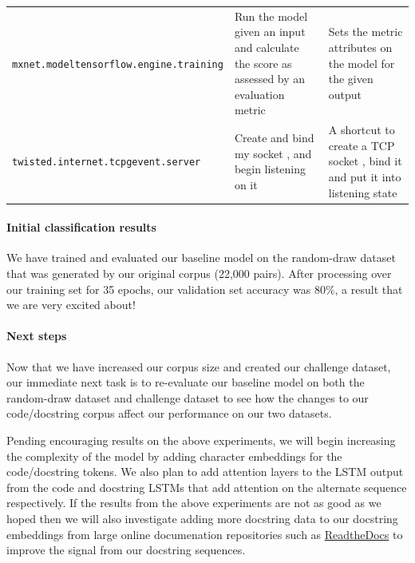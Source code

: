 \documentclass[article, 12pt, oneside]{memoir}
\begin{document}
\begin{longtable}[]{@{}lll@{}}
\begin{minipage}[t]{0.31\columnwidth}\raggedright
\texttt{mxnet.model}\texttt{tensorflow.engine.training}\strut
\end{minipage} & \begin{minipage}[t]{0.31\columnwidth}\raggedright
Run the model given an input and calculate the score as assessed by an
evaluation metric\strut
\end{minipage} & \begin{minipage}[t]{0.29\columnwidth}\raggedright
Sets the metric attributes on the model for the given output\strut
\end{minipage}\tabularnewline
\begin{minipage}[t]{0.31\columnwidth}\raggedright
\texttt{twisted.internet.tcp}\texttt{gevent.server}\strut
\end{minipage} & \begin{minipage}[t]{0.31\columnwidth}\raggedright
Create and bind my socket , and begin listening on it\strut
\end{minipage} & \begin{minipage}[t]{0.29\columnwidth}\raggedright
A shortcut to create a TCP socket , bind it and put it into listening
state\strut
\end{minipage}\tabularnewline
\bottomrule
\end{longtable}

\hypertarget{initial-classification-results}{%
\paragraph{Initial classification
results}\label{initial-classification-results}}

We have trained and evaluated our baseline model on the random-draw
dataset that was generated by our original corpus (22,000 pairs). After
processing over our training set for 35 epochs, our validation set
accuracy was 80\%, a result that we are very excited about!

\hypertarget{next-steps-1}{%
\paragraph{Next steps}\label{next-steps-1}}

Now that we have increased our corpus size and created our challenge
dataset, our immediate next task is to re-evaluate our baseline model on
both the random-draw dataset and challenge dataset to see how the
changes to our code/docstring corpus affect our performance on our two
datasets.

Pending encouraging results on the above experiments, we will begin
increasing the complexity of the model by adding character embeddings
for the code/docstring tokens. We also plan to add attention layers to
the LSTM output from the code and docstring LSTMs that add attention on
the alternate sequence respectively. If the results from the above
experiments are not as good as we hoped then we will also investigate
adding more docstring data to our docstring embeddings from large online
documenation repositories such as
\href{https://readthedocs.org/}{ReadtheDocs} to improve the signal from
our docstring sequences.
\end{document}
